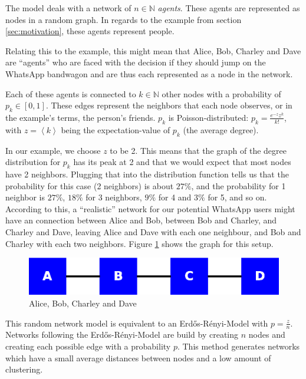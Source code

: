 \documentclass{sig-alternate-05-2015}
\begin{document}
The model deals with a network of $n \in \mathbb{N}$ \emph{agents}. These agents are represented as nodes in a random graph. In regards to the example from section \ref{sec:motivation}, these agents represent people.

Relating this to the example, this might mean that Alice, Bob, Charley and Dave are ``agents'' who are faced with the decision if they should jump on the WhatsApp bandwagon and are thus each represented as a node in the network.

Each of these agents is connected to $k \in \mathbb{N}$ other nodes with a probability of $p_k \in [0,1]$. These edges represent the neighbors that each node observes, or in the example's terms, the person's friends. $p_k$ is Poisson-distributed: $p_k = \frac{e^{-z}z^k}{k!}$, with $z = \left<k\right>$ being the expectation-value of $p_k$ (the average degree).

In our example, we choose $z$ to be 2. This means that the graph of the degree distribution for $p_k$ has its peak at 2 and that we would expect that most nodes have 2 neighbors. Plugging that into the distribution function tells us that the probability for this case (2 neighbors) is about $27\%$, and the probability for 1 neighbor is $27\%$, $18\%$ for 3 neighbors, $9\%$ for 4 and $3\%$ for 5, and so on. According to this, a ``realistic'' network for our potential WhatsApp users might have an connection between Alice and Bob, between Bob and Charley, and Charley and Dave, leaving Alice and Dave with each one neighbour, and Bob and Charley with each two neighbors. Figure \ref{fig:abcd} shows the graph for this setup.

\begin{figure}[h!]
    \includegraphics[width=\columnwidth]{img/abcd}
    \centering
    \caption{Alice, Bob, Charley and Dave}
    \label{fig:abcd}
\end{figure}

This random network model is equivalent to an Erdős-Rényi-Model with $p = \frac{z}{n}$. Networks following the Erdős-Rényi-Model are build by creating $n$ nodes and creating each possible edge with a probability $p$. This method generates networks which have a small average distances between nodes and a low amount of clustering.
\end{document}
